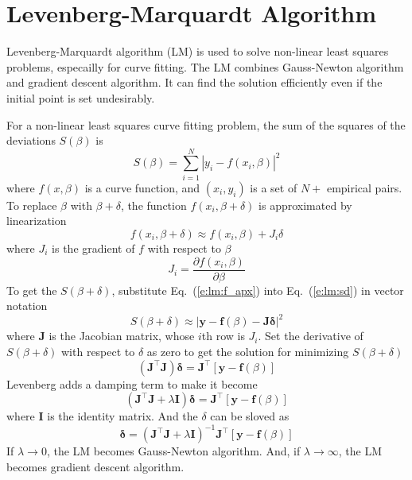 \documentclass{turgon}
\begin{document}
\chapter{Levenberg-Marquardt Algorithm}

Levenberg-Marquardt algorithm (LM) is used to solve non-linear least
squares problems, especailly for curve fitting. The LM combines
Gauss-Newton algorithm and gradient descent algorithm. It can find the
solution efficiently even if the initial point is set undesirably.

For a non-linear least squares curve fitting problem, the sum of the
squares of the deviations $S(\beta)$ is
\begin{equation}
    \label{e:lm:sd}
    S(\beta) = \sum_{i=1}^N \left| y_i - f(x_i, \beta) \right|^2
\end{equation}
where $f(x, \beta)$ is a curve function, and $(x_i, y_i)$ is a set of $N+$
empirical pairs. To replace $\beta$ with $\beta + \delta$, the function
$f(x_i, \beta + \delta)$ is approximated by linearization
\begin{equation}
    f(x_i, \beta + \delta) \approx f(x_i, \beta) + J_i \delta
    \label{e:lm:f_apx}
\end{equation}
where $J_i$ is the gradient of $f$ with respect to $\beta$
\begin{equation*}
    J_i = \frac{\partial f(x_i, \beta)}{\partial \beta}
\end{equation*}
To get the $S(\beta + \delta)$, substitute Eq.~(\ref{e:lm:f_apx}) into
Eq.~(\ref{e:lm:sd}) in vector notation
\begin{equation*}
    S(\beta + \delta) \approx
    \left| \mathbf{y} - \mathbf{f}(\beta) - \mathbf{J} \mathbf{\delta} \right|^2
\end{equation*}
where $\mathbf{J}$ is the Jacobian matrix, whose $i$th row is $J_i$. Set
the derivative of $S(\beta + \delta)$ with respect to $\delta$ as zero to
get the solution for minimizing $S(\beta + \delta)$
\begin{equation*}
    \left( \mathbf{J}^\top \mathbf{J} \right) \mathbf{\delta} =
    \mathbf{J}^\top \left[ \mathbf{y} - \mathbf{f}(\beta) \right]
\end{equation*}
Levenberg adds a damping term to make it become
\begin{equation*}
    \left( \mathbf{J}^\top \mathbf{J} + \lambda \mathbf{I} \right)
    \mathbf{\delta} =
    \mathbf{J}^\top \left[ \mathbf{y} - \mathbf{f}(\beta) \right]
\end{equation*}
where $\mathbf{I}$ is the identity matrix. And the $\delta$ can be sloved as
\begin{equation}
    \mathbf{\delta} = \left( \mathbf{J}^\top \mathbf{J} + \lambda \mathbf{I} \right)^{-1}
    \mathbf{J}^\top \left[ \mathbf{y} - \mathbf{f}(\beta) \right]
    \label{e:lm:sol}
\end{equation}
If $\lambda \rightarrow 0$, the LM becomes Gauss-Newton algorithm. And, if
$\lambda \rightarrow \infty$, the LM becomes gradient descent algorithm.
\end{document}
